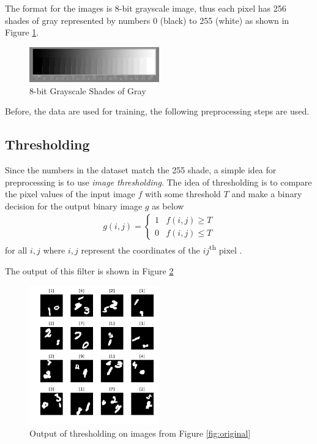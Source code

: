 \documentclass[letterpaper, 10 pt, conference]{ieeeconf}  %
\begin{document}
 The format for the images is 8-bit grayscale image, thus each pixel has 256 shades of gray represented by numbers 0 (black) to 255 (white) as shown in Figure \ref{fig:maxeig2}.

	
\begin{figure}[h]
	\begin{center}
			\includegraphics[width=0.5\textwidth]{figures/21stepwide8bit.jpg}  %
		\caption{8-bit Grayscale Shades of Gray}
		\label{fig:maxeig2}
	\end{center}
\end{figure}

Before, the data are used for training, the following preprocessing steps are used.

\subsection{Thresholding} 
Since the numbers in the dataset match the 255 shade, a simple idea for preprocessing is to use \textit{image thresholding}. 
The idea of thresholding is to compare the pixel values of the input image $f$ with some threshold $T$ and make a binary decision for the output binary image $g$ as below
\begin{align}
g(i,j) = \begin{cases}
1 & f(i,j)\ge T\\
0 & f(i,j)\le T
\end{cases}
\end{align}
for all $i, j$ where $i, j$ represent the coordinates of the $ij$\textsuperscript{th} pixel \cite{bovik2009essential}.

The output of this filter is shown in Figure \ref{fig:thresholded}

\begin{figure}[h]
	\begin{center}
		\includegraphics[width=0.5\textwidth]{figures/thresholdDataset.pdf}  %
		\caption{Output of thresholding on images from Figure \ref{fig:original}}
		\label{fig:thresholded}
	\end{center}
\end{figure}
\end{document}
